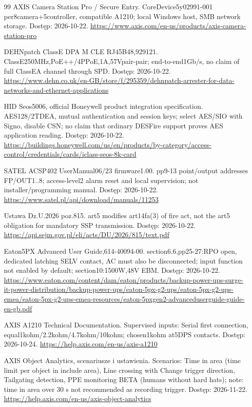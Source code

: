 \begin{thebibliography}{99}
 AXIS Camera Station Pro / Secure Entry. CoreDevice5y02991-001 per8camera+5controller, compatible A1210; local Windows host, SMB network storage. Dostęp: 2026-10-22.
\url{https://www.axis.com/en-us/products/axis-camera-station-pro}

 DEHNpatch ClassE DPA M CLE RJ45B48,929121. ClassE250MHz,PoE++/4PPoE,1A,57Vpair-pair; end-to-end1Gb/s, no claim of full ClassEA channel through SPD. Dostęp: 2026-10-22.
\url{https://www.dehn.co.uk/en-GB/store/f/295359/dehnpatch-arrester-for-data-networks-and-ethernet-applications}

 HID Seos5006, official Honeywell product integration specification. AES128/2TDEA, mutual authentication and session keys; select AES/SIO with Signo, disable CSN; no claim that ordinary DESFire support proves AES application reading. Dostęp: 2026-10-22.
\url{https://buildings.honeywell.com/us/en/products/by-category/access-control/credentials/cards/iclass-seos-8k-card}

 SATEL ACSP402 UserManual06/23 firmware1.00. pp9-13 point/output addresses FP/OUT1..8; access-level2 alarm reset and local supervision; not installer/programming manual. Dostęp: 2026-10-22.
\url{https://www.satel.pl/api/download/manuals/11253}

 Ustawa Dz.U.2026 poz.815. art5 modifies art14fa(3) of fire act, not the art5 obligation for mandatory SSP transmission. Dostęp: 2026-10-22.
\url{https://api.sejm.gov.pl/eli/acts/DU/2026/815/text.pdf}

 Eaton5PX Advanced User Guide,614-40094-00. section6.6,pp25-27:RPO open, dedicated latching SELV contact, AC must also be disconnected; input function not enabled by default; section10:1500W,48V EBM. Dostęp: 2026-10-22.
\url{https://www.eaton.com/content/dam/eaton/products/backup-power-ups-surge-it-power-distribution/backup-power-ups/eaton-5px-g2-ups/eaton-5px-g2-ups-emea/eaton-5px-g2-ups-emea-resources/eaton-5pxgen2-advanceduserguide-guide-en-gb.pdf}

 AXIS A1210 Technical Documentation. Supervised inputs: Serial first connection, equal1kohm/2.2kohm/4.7kohm/10kohm; chosen1kohm at5DPS contacts. Dostęp: 2026-10-24.
\url{https://help.axis.com/en-us/axis-a1210}

 AXIS Object Analytics, scenariusze i ustawienia. Scenarios: Time in area (time limit per object in include area), Line crossing with Change trigger direction, Tailgating detection, PPE monitoring BETA (humans without hard hats); note: time in area over 30 s not recommended as recording trigger. Dostęp: 2026-11-22.
\url{https://help.axis.com/en-us/axis-object-analytics}


\end{thebibliography}
